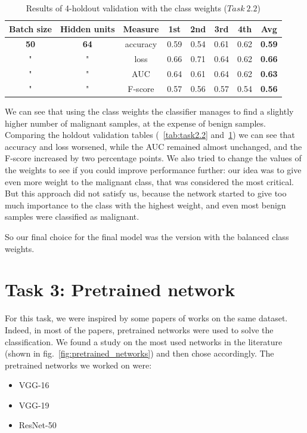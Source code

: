 \documentclass[11pt,a4paper,oneside]{article}
\begin{document}
\begin{table}[h]
\centering
\begin{tabular}{|cccccccc|}
\hline
Batch size & Hidden units & Measure & 1st & 2nd & 3rd & 4th & \textbf{Avg} \\
\hline
\textbf{50} & \textbf{64} & accuracy & 0.59 & 0.54 & 0.61 & 0.62 & \textbf{0.59} \\
" & " & loss & 0.66 & 0.71 & 0.64 & 0.62 & \textbf{0.66} \\
" & " & AUC & 0.64 & 0.61 & 0.64 & 0.62 & \textbf{0.63} \\
" & " & F-score & 0.57 & 0.56 & 0.57 & 0.54 & \textbf{0.56} \\
\hline
\end{tabular}
\caption{Results of 4-holdout validation with the class weights ($Task\ 2.2$)}
\label{tab:task2.2_weight}
\end{table}

We can see that using the class weights the classifier manages to find a slightly higher number of malignant samples, at the expense of benign samples. Comparing the holdout validation tables (~\ref{tab:task2.2} and~\ref{tab:task2.2_weight}) we can see that accuracy and loss worsened, while the AUC remained almost unchanged, and the F-score increased by two percentage points. 
We also tried to change the values of the weights to see if you could improve performance further: our idea was to give even more weight to the malignant class, that was considered the most critical. But this approach did not satisfy us, because the network started to give too much importance to the class with the highest weight, and even most benign samples were classified as malignant.

So our final choice for the final model was the version with the balanced class weights.


\clearpage

\section{Task 3: Pretrained network}
For this task, we were inspired by some papers of works on the same dataset. Indeed, in most of the papers, pretrained networks were used to solve the classification. 
We found a study on the most used networks in the literature (shown in fig.~\ref{fig:pretrained_networks}) and then chose accordingly. The pretrained networks we worked on were:
\begin{itemize}
\item VGG-16
\item VGG-19
\item ResNet-50
\end{itemize}
\end{document}
